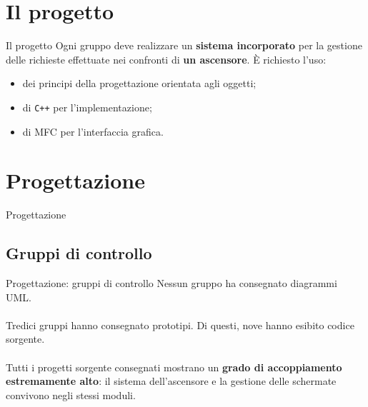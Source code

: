 \documentclass{beamer}
\begin{document}
\section{Il progetto}
\begin{frame}{Il progetto}
	Ogni gruppo deve realizzare un \textbf{sistema incorporato} per la gestione
	delle richieste effettuate nei confronti di \textbf{un ascensore}. È richiesto
	l'uso:
	\begin{itemize}
		\item dei principi della progettazione orientata agli oggetti;
		\item di \texttt{C++} per l'implementazione;
		\item di MFC per l'interfaccia grafica.
	\end{itemize}
\end{frame}

\section{Progettazione}
\begin{frame}
	\vfill
	\centering
	Progettazione
	\vfill
\end{frame}

\subsection{Gruppi di controllo}
\begin{frame}{Progettazione: gruppi di controllo}
	Nessun gruppo ha consegnato diagrammi UML.
	\\~\\
	Tredici gruppi hanno consegnato prototipi. Di questi, nove hanno esibito
	codice sorgente.
	\\~\\
	Tutti i progetti sorgente consegnati mostrano un \textbf{grado di
		accoppiamento estremamente alto}: il sistema dell'ascensore e la gestione
	delle schermate convivono negli stessi moduli.
\end{frame}
\end{document}
